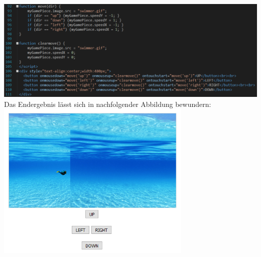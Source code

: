 \newline
\includegraphics[width=1\textwidth]{img/vincent/abb08.png}
\newline
Das Endergebnis l\"asst sich in nachfolgender Abbildung bewundern:
\newline
\includegraphics[width=0.7\textwidth]{img/vincent/abb09.png}
\newline

